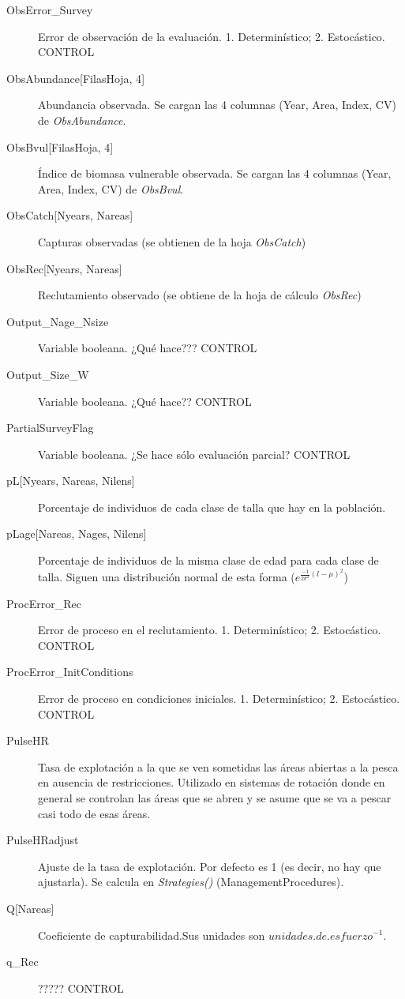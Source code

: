 \documentclass[12pt, oneside, a4paper]{article}
\begin{document}
\begin{description}
		
		\item[ObsError\_Survey] Error de observación de la evaluación. 1. Determinístico; 2. Estocástico. CONTROL
		\item[ObsAbundance{[}FilasHoja, 4{]}] Abundancia observada. Se cargan las 4 columnas (Year, Area, Index, CV) de \emph{ObsAbundance}.
		\item[ObsBvul{[}FilasHoja, 4{]}] Índice de biomasa vulnerable observada. Se cargan las 4 columnas (Year, Area, Index, CV) de \emph{ObsBvul}.
		\item[ObsCatch{[}Nyears, Nareas{]}] Capturas observadas (se obtienen de la hoja \emph{ObsCatch})
		\item[ObsRec{[}Nyears, Nareas{]}] Reclutamiento observado (se obtiene de la hoja de cálculo \emph{ObsRec})
		\item[Output\_Nage\_Nsize] Variable booleana. ¿Qué hace??? CONTROL
		\item[Output\_Size\_W] Variable booleana. ¿Qué hace?? CONTROL
		
		\item[PartialSurveyFlag] Variable booleana. ¿Se hace sólo evaluación parcial? CONTROL
		\item[pL{[}Nyears, Nareas, Nilens{]}] Porcentaje de individuos de cada clase de talla que hay en la población.
		\item[pLage{[}Nareas, Nages, Nilens{]}] Porcentaje de individuos de la misma clase de edad para cada clase de talla. Siguen una distribución normal de esta forma ($e^{\frac{-1}{2 \sigma^2} (l-\mu)^2}$)		
		\item[ProcError\_Rec] Error de proceso en el reclutamiento. 1. Determinístico; 2. Estocástico. CONTROL
		\item[ProcError\_InitConditions] Error de proceso en condiciones iniciales. 1. Determinístico; 2. Estocástico. CONTROL
		\item[PulseHR] Tasa de explotación a la que se ven sometidas las áreas abiertas a la pesca en ausencia de restricciones. Utilizado en sistemas de rotación donde en general se controlan las áreas que se abren y se asume que se va a pescar casi todo de esas áreas. 
		\item[PulseHRadjust] Ajuste de la tasa de explotación. Por defecto es 1 (es decir, no hay que ajustarla). Se calcula en \emph{Strategies()} (ManagementProcedures).
		   
		\item[Q{[}Nareas{]}] Coeficiente de capturabilidad.Sus unidades son $unidades.de.esfuerzo^{-1}$.
		\item[q\_Rec] ????? CONTROL
		

\end{description}
\end{document}
